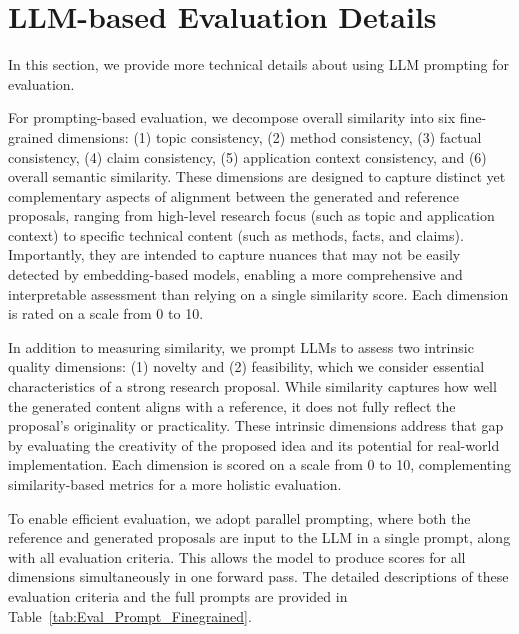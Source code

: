 

\section{LLM-based Evaluation Details}
\label{sec:llm-based-eval}
In this section, we provide more technical details about using LLM prompting for evaluation.

 For prompting-based evaluation, we decompose overall similarity into six fine-grained dimensions: (1) topic consistency, (2) method consistency, (3) factual consistency, (4) claim consistency, (5) application context consistency, and (6) overall semantic similarity. These dimensions are designed to capture distinct yet complementary aspects of alignment between the generated and reference proposals, ranging from high-level research focus (such as topic and application context) to specific technical content (such as methods, facts, and claims). Importantly, they are intended to capture nuances that may not be easily detected by embedding-based models, enabling a more comprehensive and interpretable assessment than relying on a single similarity score. Each dimension is rated on a scale from 0 to 10.


 In addition to measuring similarity, we prompt LLMs to assess two intrinsic quality dimensions: (1) novelty and (2) feasibility, which we consider essential characteristics of a strong research proposal. While similarity captures how well the generated content aligns with a reference, it does not fully reflect the proposal's originality or practicality. These intrinsic dimensions address that gap by evaluating the creativity of the proposed idea and its potential for real-world implementation. Each dimension is scored on a scale from 0 to 10, complementing similarity-based metrics for a more holistic evaluation.


 To enable efficient evaluation, we adopt parallel prompting, where both the reference and generated proposals are input to the LLM in a single prompt, along with all evaluation criteria. This allows the model to produce scores for all dimensions simultaneously in one forward pass. The detailed descriptions of these evaluation criteria and the full prompts are provided in Table~\ref{tab:Eval_Prompt_Finegrained}.



